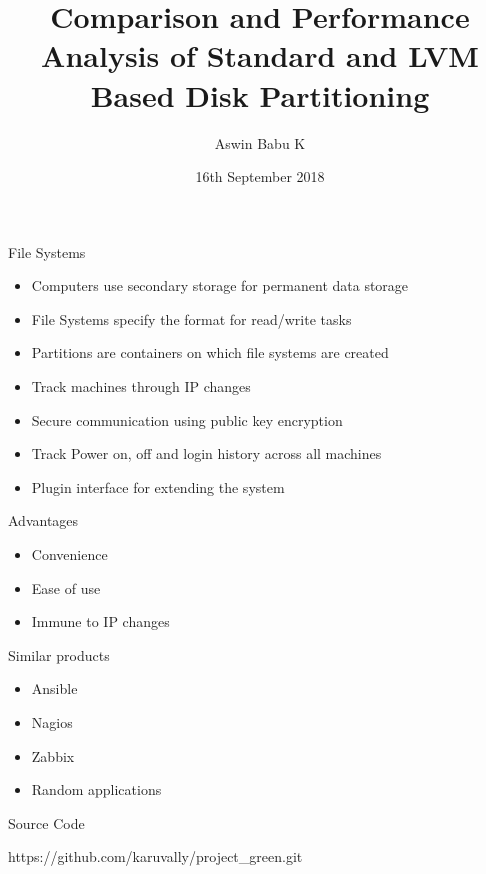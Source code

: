 \documentclass{beamer}
\title[Your Short Title]{Comparison and Performance Analysis of Standard and
LVM Based Disk Partitioning}
\author{Aswin Babu K}
\institute{College of Engineering Trivandrum}
\date{16th September 2018}
\begin{document}
\begin{frame}
    \titlepage
\end{frame}

\begin{frame}{File Systems}
    \begin{itemize}
        \item<2-> Computers use secondary storage for permanent data storage
        \item<3-> File Systems specify the format for read/write tasks
        \item<4-> Partitions are containers on which file systems are created
        \item<5-> Track machines through IP changes
        \item<6-> Secure communication using public key encryption
        \item<7-> Track Power on, off and login history across all machines
        \item<8-> Plugin interface for extending the system
    \end{itemize}
\end{frame}

\begin{frame}{Advantages}
    \begin{itemize}
        \item<2-> Convenience
        \item<3-> Ease of use
        \item<4-> Immune to IP changes 
    \end{itemize}
\end{frame}

\begin{frame}{Similar products}
    \begin{itemize}
        \item<2-> Ansible
        \item<3-> Nagios
        \item<4-> Zabbix
        \item<5-> Random applications
    \end{itemize}
\end{frame}

\begin{frame}{Source Code} 
    \begin{center}
        \large https://github.com/karuvally/project\_green.git
    \end{center}
\end{frame}
\end{document}
